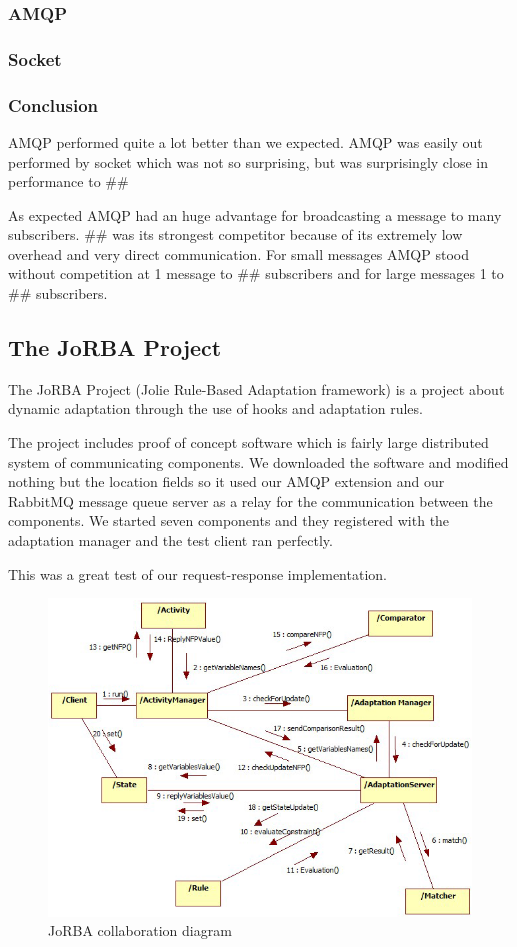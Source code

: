 \subsubsection{AMQP}

\subsubsection{Socket}

\subsubsection{Conclusion}
AMQP performed quite a lot better than we expected. AMQP was easily out performed by socket which was not so surprising, but was surprisingly close in performance to \#\#

As expected AMQP had an huge advantage for broadcasting a message to many subscribers. \#\# was its strongest competitor because of its extremely low overhead and very direct communication. For small messages AMQP stood without competition at 1 message to \#\# subscribers and for large messages 1 to \#\# subscribers.
\subsection{The JoRBA Project}
\label{subsec:The JoRBA Project}
The JoRBA Project\cite{Jorba} (Jolie Rule-Based Adaptation framework) is a project about dynamic adaptation through the use of hooks and adaptation rules.

The project includes proof of concept software which is fairly large distributed system of communicating components. We downloaded the software and modified nothing but the location fields so it used our AMQP extension and our RabbitMQ message queue server as a relay for the communication between the components. We started seven components and they registered with the adaptation manager and the test client ran perfectly.

This was a great test of our request-response implementation.
\begin{figure}[H]
  \includegraphics[width=\textwidth]{illustrations/Jorba.png}
  \caption{JoRBA collaboration diagram}
\end{figure}
\newpage